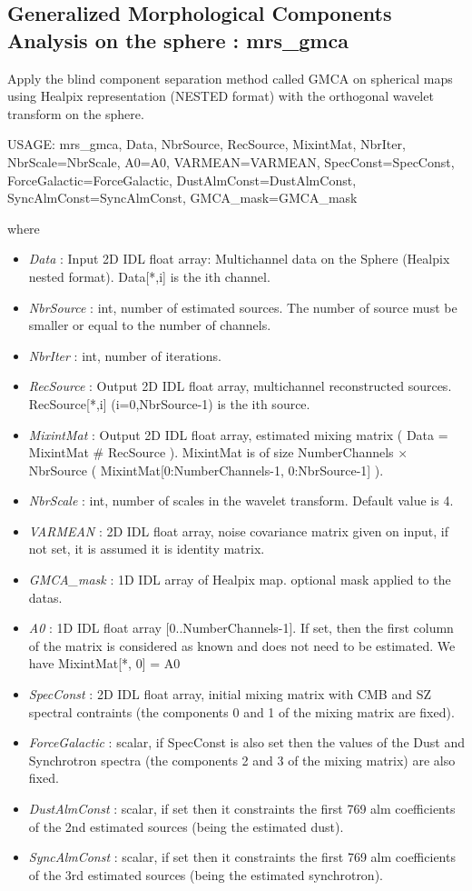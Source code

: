 \subsection{Generalized Morphological Components Analysis on the sphere : mrs\_gmca}
Apply the blind component separation method called GMCA on spherical maps using Healpix 
representation (NESTED format) with the orthogonal wavelet transform on the sphere.
{\bf
\begin{center}
     USAGE: mrs\_gmca, Data, NbrSource, RecSource, MixintMat, NbrIter, NbrScale=NbrScale, A0=A0, VARMEAN=VARMEAN, SpecConst=SpecConst, 
     ForceGalactic=ForceGalactic, DustAlmConst=DustAlmConst, SyncAlmConst=SyncAlmConst, GMCA\_mask=GMCA\_mask
\end{center}}
where 
\begin{itemize}
\item {\em Data} : Input 2D IDL float array: Multichannel data on the Sphere (Healpix nested format). Data[*,i] is the ith channel.
\item {\em NbrSource} : int, number of estimated sources. The number of source must be smaller or equal to the number of channels.
\item {\em NbrIter} : int, number of iterations.
\item {\em RecSource} : Output 2D IDL float array, multichannel reconstructed sources. RecSource[*,i] (i=0,NbrSource-1) is the ith source.
\item {\em MixintMat} : Output 2D IDL float array, estimated mixing matrix ( Data = MixintMat \# RecSource ). 
MixintMat is of size NumberChannels $\times$ NbrSource ( MixintMat[0:NumberChannels-1, 0:NbrSource-1] ).
\item {\em NbrScale} : int, number of scales in the wavelet transform. Default value is 4.
\item {\em VARMEAN} : 2D IDL float array, noise covariance matrix given on input, if not set, it is assumed it is identity matrix.
\item {\em GMCA\_mask} : 1D IDL array of Healpix map. optional mask applied to the datas.
\item {\em A0} : 1D IDL float array [0..NumberChannels-1]. If set, then the first column of the matrix is considered as known and does not need to be estimated. We have MixintMat[*, 0] = A0
\item {\em SpecConst} : 2D IDL float array, initial mixing matrix with CMB and SZ spectral contraints (the components 0 and 1 of the mixing matrix are fixed).
\item {\em ForceGalactic} : scalar, if SpecConst is also set then the values of the Dust and Synchrotron spectra (the components 2 and 3 of the mixing matrix) are also fixed.
\item {\em DustAlmConst} : scalar, if set then it constraints the first 769 alm coefficients of the 2nd estimated sources (being the estimated dust).
\item {\em SyncAlmConst} : scalar, if set then it constraints the first 769 alm coefficients of the 3rd estimated sources (being the estimated synchrotron).
\end{itemize}

